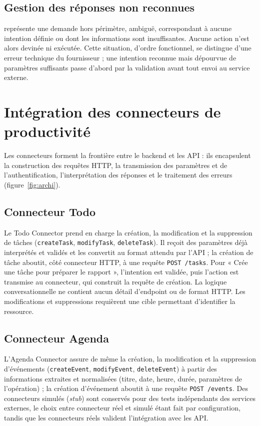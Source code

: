\documentclass[11pt,a4paper,openany,oneside]{report}
\newcommand{\intent}[1]{\texttt{\detokenize{#1}}}
\begin{document}
\subsection{Gestion des réponses non reconnues}
\intent{unrecognized} représente une demande hors périmètre, ambiguë, correspondant à aucune intention définie ou dont les informations sont insuffisantes. Aucune action n'est alors devinée ni exécutée. Cette situation, d'ordre fonctionnel, se distingue d'une erreur technique du fournisseur ; une intention reconnue mais dépourvue de paramètres suffisants passe d'abord par la validation avant tout envoi au service externe.

\section{Intégration des connecteurs de productivité}
Les connecteurs forment la frontière entre le backend et les API : ils encapsulent la construction des requêtes HTTP, la transmission des paramètres et de l'authentification, l'interprétation des réponses et le traitement des erreurs (figure~\ref{fig:archi}).

\subsection{Connecteur Todo}
Le Todo Connector prend en charge la création, la modification et la suppression de tâches (\texttt{createTask}, \texttt{modifyTask}, \texttt{deleteTask}). Il reçoit des paramètres déjà interprétés et validés et les convertit au format attendu par l'API ; la création de tâche aboutit, côté connecteur HTTP, à une requête \texttt{POST /tasks}. Pour « Crée une tâche pour préparer le rapport », l'intention \intent{create_task} est validée, puis l'action est transmise au connecteur, qui construit la requête de création. La logique conversationnelle ne contient aucun détail d'endpoint ou de format HTTP. Les modifications et suppressions requièrent une cible permettant d'identifier la ressource.

\subsection{Connecteur Agenda}
L'Agenda Connector assure de même la création, la modification et la suppression d'événements (\texttt{createEvent}, \texttt{modifyEvent}, \texttt{deleteEvent}) à partir des informations extraites et normalisées (titre, date, heure, durée, paramètres de l'opération) ; la création d'événement aboutit à une requête \texttt{POST /events}. Des connecteurs simulés (\emph{stub}) sont conservés pour des tests indépendants des services externes, le choix entre connecteur réel et simulé étant fait par configuration, tandis que les connecteurs réels valident l'intégration avec les API.
\end{document}
